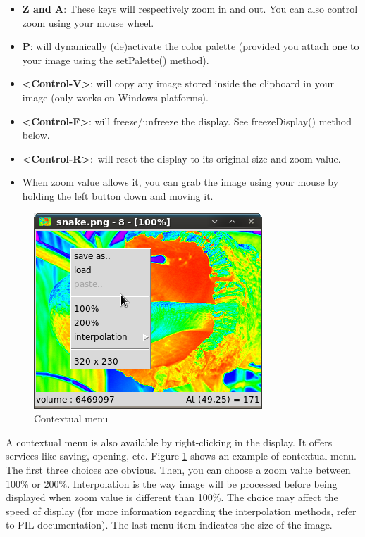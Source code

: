 \documentclass[a4paper,10pt,oneside]{article}
\begin{document}
\begin{itemize}
\item \textbf{Z and A}: These keys will respectively zoom in and out. You can
also control zoom using your mouse wheel.
\item \textbf{P}: will dynamically (de)activate the color palette (provided you
attach one to your image using the setPalette() method).
\item \textbf{<Control-V>}: will copy any image stored inside the clipboard 
in your image (only works on Windows platforms).
\item \textbf{<Control-F>}: will freeze/unfreeze the display. See freezeDisplay() 
method below.
\item \textbf{<Control-R>}: will reset the display to its original size and 
zoom value.
\item When zoom value allows it, you can grab the image using your mouse by
holding the left button down and moving it.
\end{itemize}

\begin{figure}
\centering
\includegraphics[scale=0.5]{mamba_menu.png}
\caption{Contextual menu}
\label{fig:menu}
\end{figure}

A contextual menu is also available by right-clicking in the display. It offers
services like saving, opening, etc. Figure \ref{fig:menu} shows an example of 
contextual menu. The first three choices are obvious. Then, you can choose a zoom
value between 100\% or 200\%. Interpolation is the way image will be processed
before being displayed when zoom value is different than 100\%. The choice
may affect the speed of display (for more information regarding the interpolation
methods, refer to PIL documentation). The last menu item indicates the size of
the image.
\end{document}
